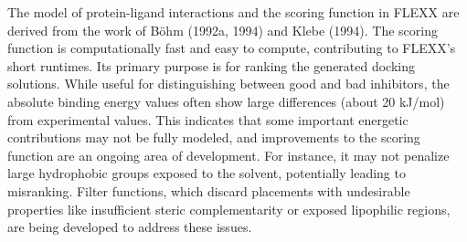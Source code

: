 \documentclass[11pt]{article}
\begin{document}
The model of protein-ligand interactions and the scoring function in FLEXX are derived from the work of Böhm (1992a, 1994) and Klebe (1994). The scoring function is computationally fast and easy to compute, contributing to FLEXX's short runtimes. Its primary purpose is for ranking the generated docking solutions.
While useful for distinguishing between good and bad inhibitors, the absolute binding energy values often show large differences (about 20 kJ/mol) from experimental values. This indicates that some important energetic contributions may not be fully modeled, and improvements to the scoring function are an ongoing area of development. For instance, it may not penalize large hydrophobic groups exposed to the solvent, potentially leading to misranking. Filter functions, which discard placements with undesirable properties like insufficient steric complementarity or exposed lipophilic regions, are being developed to address these issues.
\end{document}
